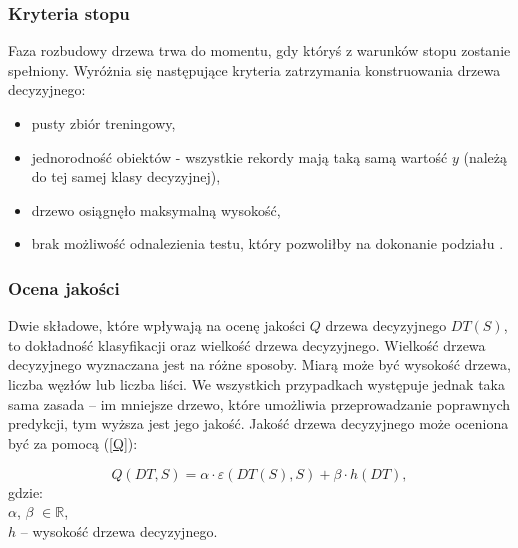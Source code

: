 \documentclass[12pt]{article}
\begin{document}
\begin{itemize}

\end{itemize}

\subsubsection{Kryteria stopu}
Faza rozbudowy drzewa trwa do momentu, gdy któryś z warunków stopu zostanie spełniony.
Wyróżnia się następujące kryteria zatrzymania konstruowania drzewa decyzyjnego:
\begin{itemize}
    \item pusty zbiór treningowy,
    \item jednorodność obiektów - wszystkie rekordy mają taką samą wartość $y$ (należą do tej samej klasy decyzyjnej),
    \item drzewo osiągnęło maksymalną wysokość,
    \item brak możliwość odnalezienia testu, który pozwoliłby na dokonanie podziału \cite{data-mining-with-decision-trees}.
\end{itemize}

\subsubsection{Ocena jakości}
Dwie składowe, które wpływają na ocenę jakości $Q$ drzewa decyzyjnego $DT(S)$, to dokładność klasyfikacji oraz wielkość drzewa decyzyjnego.
Wielkość drzewa decyzyjnego wyznaczana jest na różne sposoby. Miarą może być wysokość drzewa, liczba węzłów
lub liczba liści. We wszystkich przypadkach występuje jednak taka sama zasada -- im mniejsze drzewo, które
umożliwia przeprowadzanie poprawnych predykcji, tym wyższa jest jego jakość. Jakość drzewa decyzyjnego może oceniona być za pomocą (\ref{Q}):


\begin{equation}\label{Q}
Q(DT, S) = \alpha \cdot  \hat{\varepsilon}(DT(S), S) + \beta \cdot h(DT),
\end{equation}
gdzie: \\
$\alpha$, $\beta$ $\in \mathbb{R}$,\\
$h$ -- wysokość drzewa decyzyjnego.
\end{document}
